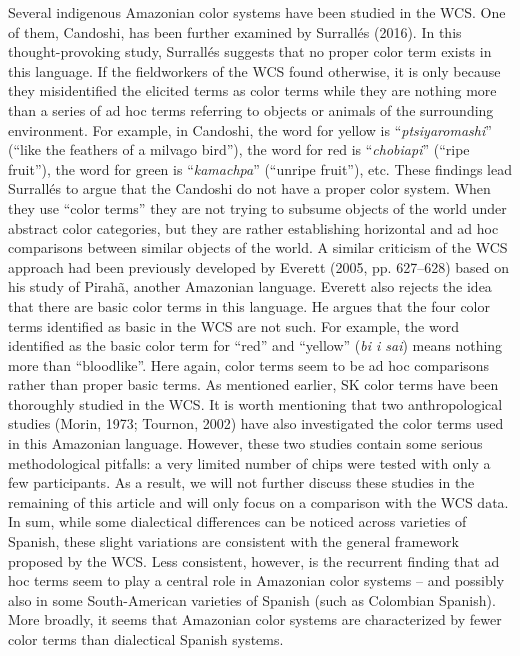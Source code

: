 \documentclass[
  english,
  ,man,floatsintext]{apa6}
\begin{document}
Several indigenous Amazonian color systems have been studied in the WCS. One of them, Candoshi, has been further examined by Surrallés (2016). In this thought-provoking study, Surrallés suggests that no proper color term exists in this language. If the fieldworkers of the WCS found otherwise, it is only because they misidentified the elicited terms as color terms while they are nothing more than a series of ad hoc terms referring to objects or animals of the surrounding environment. For example, in Candoshi, the word for yellow is \enquote{\emph{ptsiyaromashi}} (\enquote{like the feathers of a milvago bird}), the word for red is \enquote{\emph{chobiapi}} (\enquote{ripe fruit}), the word for green is \enquote{\emph{kamachpa}} (\enquote{unripe fruit}), etc. These findings lead Surrallés to argue that the Candoshi do not have a proper color system. When they use \enquote{color terms} they are not trying to subsume objects of the world under abstract color categories, but they are rather establishing horizontal and ad hoc comparisons between similar objects of the world.
A similar criticism of the WCS approach had been previously developed by Everett (2005, pp. 627--628) based on his study of Pirahã, another Amazonian language. Everett also rejects the idea that there are basic color terms in this language. He argues that the four color terms identified as basic in the WCS are not such. For example, the word identified as the basic color term for \enquote{red} and \enquote{yellow} (\emph{bi i sai}) means nothing more than \enquote{bloodlike}. Here again, color terms seem to be ad hoc comparisons rather than proper basic terms.
As mentioned earlier, SK color terms have been thoroughly studied in the WCS. It is worth mentioning that two anthropological studies (Morin, 1973; Tournon, 2002) have also investigated the color terms used in this Amazonian language. However, these two studies contain some serious methodological pitfalls: a very limited number of chips were tested with only a few participants. As a result, we will not further discuss these studies in the remaining of this article and will only focus on a comparison with the WCS data.
In sum, while some dialectical differences can be noticed across varieties of Spanish, these slight variations are consistent with the general framework proposed by the WCS. Less consistent, however, is the recurrent finding that ad hoc terms seem to play a central role in Amazonian color systems -- and possibly also in some South-American varieties of Spanish (such as Colombian Spanish). More broadly, it seems that Amazonian color systems are characterized by fewer color terms than dialectical Spanish systems.
\end{document}

